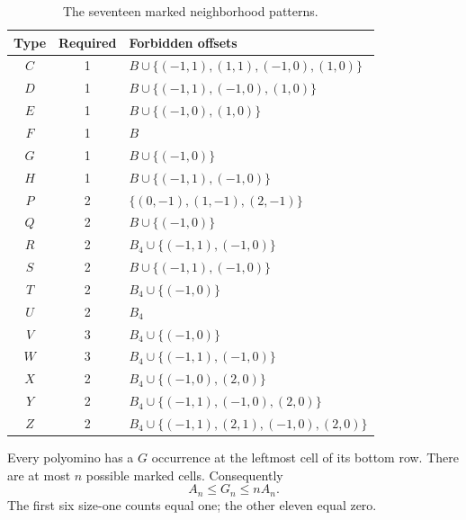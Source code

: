 \documentclass[11pt,a4paper]{article}
\theoremstyle{definition}
\theoremstyle{remark}
\begin{document}
\begin{table}[htbp]
\centering\small
\begin{tabular}{@{}ccl@{}}
\toprule
Type & Required & Forbidden offsets\\
\midrule
$C$ & 1 & $B\cup\{(-1,1),(1,1),(-1,0),(1,0)\}$\\
$D$ & 1 & $B\cup\{(-1,1),(-1,0),(1,0)\}$\\
$E$ & 1 & $B\cup\{(-1,0),(1,0)\}$\\
$F$ & 1 & $B$\\
$G$ & 1 & $B\cup\{(-1,0)\}$\\
$H$ & 1 & $B\cup\{(-1,1),(-1,0)\}$\\
$P$ & 2 & $\{(0,-1),(1,-1),(2,-1)\}$\\
$Q$ & 2 & $B\cup\{(-1,0)\}$\\
$R$ & 2 & $B_4\cup\{(-1,1),(-1,0)\}$\\
$S$ & 2 & $B\cup\{(-1,1),(-1,0)\}$\\
$T$ & 2 & $B_4\cup\{(-1,0)\}$\\
$U$ & 2 & $B_4$\\
$V$ & 3 & $B_4\cup\{(-1,0)\}$\\
$W$ & 3 & $B_4\cup\{(-1,1),(-1,0)\}$\\
$X$ & 2 & $B_4\cup\{(-1,0),(2,0)\}$\\
$Y$ & 2 & $B_4\cup\{(-1,1),(-1,0),(2,0)\}$\\
$Z$ & 2 & $B_4\cup\{(-1,1),(2,1),(-1,0),(2,0)\}$\\
\bottomrule
\end{tabular}
\caption{The seventeen marked neighborhood patterns.}
\label{kfp:tab:patterns}
\end{table}

Every polyomino has a $G$ occurrence at the leftmost cell of its bottom row.
There are at most $n$ possible marked cells. Consequently
\begin{equation}\label{kfp:eq:gdom}
 A_n\leq G_n\leq nA_n.
\end{equation}
The first six size-one counts equal one; the other eleven equal zero.
\end{document}

